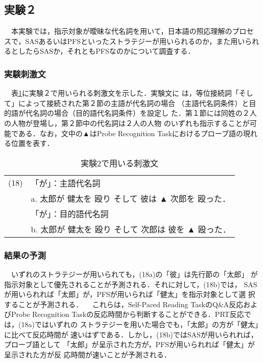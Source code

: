 \subsection{実験２}

　本実験では，指示対象が曖昧な代名詞を用いて，日本語の照応理解のプロセ
スで，SASあるいはPFSといったストラテジーが用いられるのか，また用いられ
るとしたらSASか，それともPFSなのかについて調査する．

\subsubsection{実験刺激文}
　表\ref{table:exam2as}に実験２で用いられる刺激文を示した．実験文に
は，等位接続詞「そして」によって接続された第２節の主語が代名詞の場合
（主語代名詞条件）と目的語が代名詞の場合（目的語代名詞条件）を設定し
た．第１節には同姓の２人の人物が登場し，第２節中の代名詞は２人の人物
のいずれも指示することが可能である．なお，文中の▲はProbe
Recognition Taskにおけるプローブ語の現れる位置を表す．

\vspace{-3mm}
\begin{table}[htbp]
\begin{center}
\caption{実験2で用いる刺激文}
\label{table:exam2as}
\begin{tabular}{cl}\hline
(18)&「が」：主語代名詞\\
    & a. 太郎が  健太を 殴り そして 彼は ▲ 次郎を 殴った．\\
    &「が」：目的語代名詞\\
    & b. 太郎が  健太を 殴り そして 次郎は 彼を ▲ 殴った．\\ \hline
\end{tabular}
\end{center}
\end{table}
\vspace{-3mm}

\subsubsection{結果の予測}
　いずれのストラテジーが用いられても，(18a)の「彼」は先行節の「太郎」
が指示対象として優先されることが予測される．それに対して，(18b)では，
SASが用いられれば「太郎」が，PFSが用いられば「健太」を指示対象として選
択することが予測される．
　これらは，Self-Paced Reading TaskのQ\&A反応およびProbe Recognition
Taskの反応時間から判断することができる．PRT反応では，(18a)ではいずれの
ストラテジーを用いた場合でも，「太郎」の方が「健太」に比べて反応時間が
速いはずである．しかし，(18b)ではSASが用いられれば，プローブ語として
「太郎」が呈示された方が，PFSが用いられれば「健太」が呈示された方が反
応時間が速いことが予測される．

